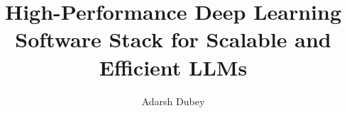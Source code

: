 \documentclass[mtech,thesis,twoside]{iist}
\title{High-Performance Deep Learning Software Stack for Scalable and Efficient LLMs}
\author{Adarsh Dubey}
\date{\thesismonthyear}
\begin{document}
\maketitle %
\makecertificate %
\makedeclaration %
\makededication %
\makeacknowledgements %
\makeabstract %
\maketableofcontents %
\makelistoffigures %
\makelistoftables %
\makelistofalgorithms %
\makeabbreviations %
\makenomenclature %

\makechaptersettings












\makebibsettings



\makepublications

\makeappendixsettings



\makeindexsettings
\end{document}
